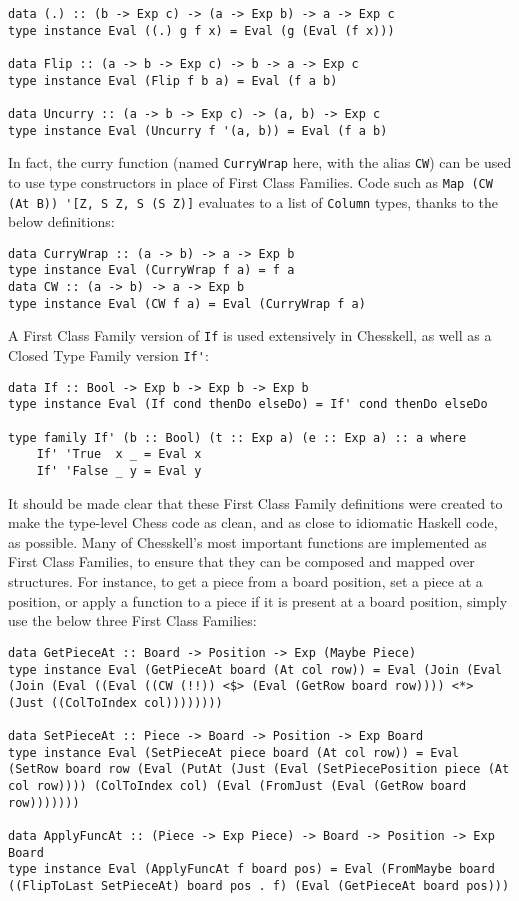 \documentclass[12pt, a4paper, bibliography=totocnumbered]{scrreprt}
\newcommand{\inline}[1]{\lstinline[basicstyle=\ttfamily\footnotesize]{#1}}
\begin{document}
\begin{lstlisting}
data (.) :: (b -> Exp c) -> (a -> Exp b) -> a -> Exp c
type instance Eval ((.) g f x) = Eval (g (Eval (f x)))

data Flip :: (a -> b -> Exp c) -> b -> a -> Exp c
type instance Eval (Flip f b a) = Eval (f a b)

data Uncurry :: (a -> b -> Exp c) -> (a, b) -> Exp c
type instance Eval (Uncurry f '(a, b)) = Eval (f a b)
\end{lstlisting}

In fact, the curry function (named \inline{CurryWrap} here, with the alias \inline{CW}) can be used to use type constructors in place of First Class Families. Code such as \inline{Map (CW (At B)) '[Z, S Z, S (S Z)]} evaluates to a list of \inline{Column} types, thanks to the below definitions:

\begin{lstlisting}
data CurryWrap :: (a -> b) -> a -> Exp b
type instance Eval (CurryWrap f a) = f a
data CW :: (a -> b) -> a -> Exp b
type instance Eval (CW f a) = Eval (CurryWrap f a)
\end{lstlisting}

A First Class Family version of \inline{If} is used extensively in Chesskell, as well as a Closed Type Family version \inline{If'}:

\begin{lstlisting}
data If :: Bool -> Exp b -> Exp b -> Exp b
type instance Eval (If cond thenDo elseDo) = If' cond thenDo elseDo

type family If' (b :: Bool) (t :: Exp a) (e :: Exp a) :: a where
    If' 'True  x _ = Eval x
    If' 'False _ y = Eval y
\end{lstlisting}

It should be made clear that these First Class Family definitions were created to make the type-level Chess code as clean, and as close to idiomatic Haskell code, as possible. Many of Chesskell's most important functions are implemented as First Class Families, to ensure that they can be composed and mapped over structures. For instance, to get a piece from a board position, set a piece at a position, or apply a function to a piece if it is present at a board position, simply use the below three First Class Families:

\begin{lstlisting}
data GetPieceAt :: Board -> Position -> Exp (Maybe Piece)
type instance Eval (GetPieceAt board (At col row)) = Eval (Join (Eval (Join (Eval ((Eval ((CW (!!)) <$> (Eval (GetRow board row)))) <*> (Just ((ColToIndex col))))))))

data SetPieceAt :: Piece -> Board -> Position -> Exp Board
type instance Eval (SetPieceAt piece board (At col row)) = Eval (SetRow board row (Eval (PutAt (Just (Eval (SetPiecePosition piece (At col row)))) (ColToIndex col) (Eval (FromJust (Eval (GetRow board row)))))))

data ApplyFuncAt :: (Piece -> Exp Piece) -> Board -> Position -> Exp Board
type instance Eval (ApplyFuncAt f board pos) = Eval (FromMaybe board ((FlipToLast SetPieceAt) board pos . f) (Eval (GetPieceAt board pos)))
\end{lstlisting}
\end{document}
